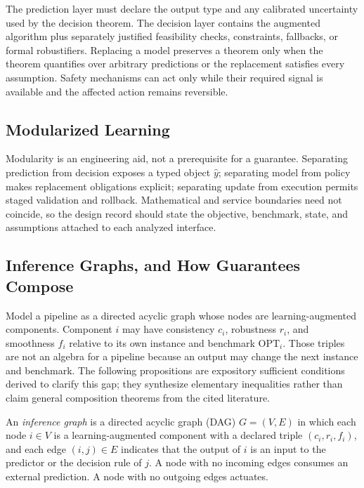 \documentclass[acmsmall,screen,nonacm]{acmart}
\theoremstyle{acmdefinition}%
\begin{document}
The prediction layer must declare the output type and any calibrated uncertainty used by the decision theorem. The decision layer contains the augmented algorithm plus separately justified feasibility checks, constraints, fallbacks, or formal robustifiers. Replacing a model preserves a theorem only when the theorem quantifies over arbitrary predictions or the replacement satisfies every assumption. Safety mechanisms can act only while their required signal is available and the affected action remains reversible.

\subsection{Modularized Learning}
\label{subsec:modular}

Modularity is an engineering aid, not a prerequisite for a guarantee. Separating prediction from decision exposes a typed object $\hat y$; separating model from policy makes replacement obligations explicit; separating update from execution permits staged validation and rollback. Mathematical and service boundaries need not coincide, so the design record should state the objective, benchmark, state, and assumptions attached to each analyzed interface.

\subsection{Inference Graphs, and How Guarantees Compose}
\label{subsec:compose}

Model a pipeline as a directed acyclic graph whose nodes are learning-augmented components. Component $i$ may have consistency $c_i$, robustness $r_i$, and smoothness $f_i$ relative to its own instance and benchmark $\mathrm{OPT}_i$. Those triples are not an algebra for a pipeline because an output may change the next instance and benchmark. The following propositions are expository sufficient conditions derived to clarify this gap; they synthesize elementary inequalities rather than claim general composition theorems from the cited literature.

\begin{definition}
\label{def:infgraph}
An \emph{inference graph} is a directed acyclic graph (DAG) $G = (V, E)$ in which each node $i \in V$ is a learning-augmented component with a declared triple $(c_i, r_i, f_i)$, and each edge $(i,j) \in E$ indicates that the output of $i$ is an input to the predictor or the decision rule of $j$. A node with no incoming edges consumes an external prediction. A node with no outgoing edges actuates.
\end{definition}
\end{document}
